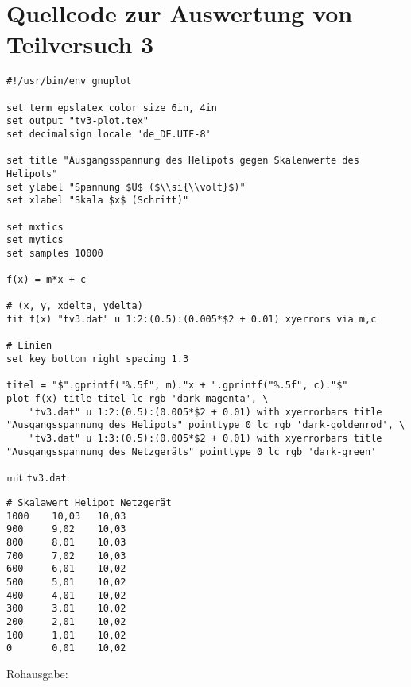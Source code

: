\section{\gnuplot{} Quellcode zur Auswertung von Teilversuch 3}
    \label{appdx:gnuplottv3}
    {  
        \renewcommand{\fcolorbox}[4][]{#4}
        \begin{verbatim}
#!/usr/bin/env gnuplot

set term epslatex color size 6in, 4in
set output "tv3-plot.tex"
set decimalsign locale 'de_DE.UTF-8'

set title "Ausgangsspannung des Helipots gegen Skalenwerte des Helipots"
set ylabel "Spannung $U$ ($\\si{\\volt}$)"
set xlabel "Skala $x$ (Schritt)"

set mxtics
set mytics
set samples 10000

f(x) = m*x + c

# (x, y, xdelta, ydelta)
fit f(x) "tv3.dat" u 1:2:(0.5):(0.005*$2 + 0.01) xyerrors via m,c

# Linien
set key bottom right spacing 1.3

titel = "$".gprintf("%.5f", m)."x + ".gprintf("%.5f", c)."$"
plot f(x) title titel lc rgb 'dark-magenta', \
    "tv3.dat" u 1:2:(0.5):(0.005*$2 + 0.01) with xyerrorbars title "Ausgangsspannung des Helipots" pointtype 0 lc rgb 'dark-goldenrod', \
    "tv3.dat" u 1:3:(0.5):(0.005*$2 + 0.01) with xyerrorbars title "Ausgangsspannung des Netzgeräts" pointtype 0 lc rgb 'dark-green'
        \end{verbatim}
    }
    mit \texttt{tv3.dat}:
    \begin{multicols}{2}
        \begin{verbatim}
# Skalawert Helipot Netzgerät
1000    10,03   10,03
900     9,02    10,03
800     8,01    10,03
700     7,02    10,03
600     6,01    10,02
500     5,01    10,02
400     4,01    10,02
300     3,01    10,02
200     2,01    10,02
100     1,01    10,02
0       0,01    10,02
        \end{verbatim}
    \end{multicols}
    \vspace{-\baselineskip}
    Rohausgabe:
